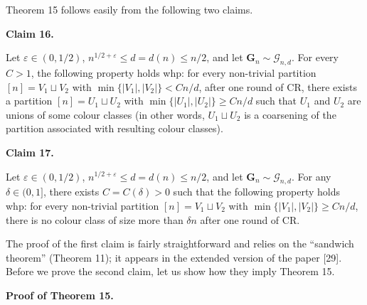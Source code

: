 \documentclass[10pt,a4paper]{article}
\begin{document}



Theorem 15 follows easily from the following two claims.\par





\par\medskip\noindent\textbf{
Claim 16. 
}\par



Let $\varepsilon\in(0,1/2)$, $n^{1/2+\varepsilon}\leq d=d(n)\leq n/2$, and let $\mathbf{G}_{n}\sim\mathcal{G}_{n,d}$.
For every $C>1$, the following property holds whp: for every non-trivial partition $[n]=V_{1}\sqcup V_{2}$ with $\min\{|V_{1}|,|V_{2}|\}<Cn/d$, after one round of CR, there exists a partition $[n]=U_{1}\sqcup U_{2}$ with $\min\{|U_{1}|,|U_{2}|\}\geq Cn/d$ such that $U_{1}$ and $U_{2}$ are unions of some colour classes (in other words, $U_{1}\sqcup U_{2}$ is a coarsening of the partition
associated with resulting colour classes).\par







\par\medskip\noindent\textbf{
Claim 17. 
}\par



Let $\varepsilon\in(0,1/2)$, $n^{1/2+\varepsilon}\leq d=d(n)\leq n/2$, and let $\mathbf{G}_{n}\sim\mathcal{G}_{n,d}$.
For any $\delta\in(0,1]$, there exists $C=C(\delta)>0$ such that the following property holds whp: for every non-trivial partition $[n]=V_{1}\sqcup V_{2}$ with $\min\{|V_{1}|,|V_{2}|\}\geq Cn/d$, there is no colour class of size more than $\delta n$ after one round of CR.\par






The proof of the first claim is fairly straightforward and relies on the “sandwich theorem” (Theorem 11); it appears in the extended version of the paper [29]. Before we prove the second claim, let us show how they imply Theorem 15.\par




\par\medskip\noindent\textbf{Proof of Theorem 15.}\par
\end{document}
